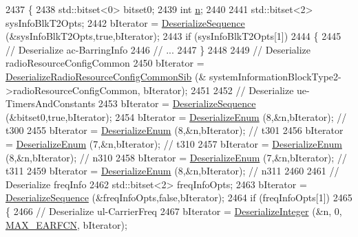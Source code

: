 \begin{DoxyCode}
2437 \{
2438   std::bitset<0> bitset0;
2439   \textcolor{keywordtype}{int} \hyperlink{namespacesample-rng-plot_aeb5ee5c431e338ef39b7ac5431242e1d}{n};
2440 
2441   std::bitset<2> sysInfoBlkT2Opts;
2442   bIterator = \hyperlink{classns3_1_1Asn1Header_a58c68bb97ba3fe2e8fcdd7c208d672b2}{DeserializeSequence} (&sysInfoBlkT2Opts,\textcolor{keyword}{true},bIterator);
2443   \textcolor{keywordflow}{if} (sysInfoBlkT2Opts[1])
2444     \{
2445       \textcolor{comment}{// Deserialize ac-BarringInfo}
2446       \textcolor{comment}{// ...}
2447     \}
2448 
2449   \textcolor{comment}{// Deserialize radioResourceConfigCommon}
2450   bIterator = \hyperlink{classns3_1_1RrcAsn1Header_af9c55f79d37667463fe12d6d1304b7e5}{DeserializeRadioResourceConfigCommonSib} (&
      systemInformationBlockType2->radioResourceConfigCommon, bIterator);
2451 
2452   \textcolor{comment}{// Deserialize ue-TimersAndConstants}
2453   bIterator = \hyperlink{classns3_1_1Asn1Header_a58c68bb97ba3fe2e8fcdd7c208d672b2}{DeserializeSequence} (&bitset0,\textcolor{keyword}{true},bIterator);
2454   bIterator = \hyperlink{classns3_1_1Asn1Header_a4fcc253e0eec3483c775b005c1875f2d}{DeserializeEnum} (8,&n,bIterator); \textcolor{comment}{// t300}
2455   bIterator = \hyperlink{classns3_1_1Asn1Header_a4fcc253e0eec3483c775b005c1875f2d}{DeserializeEnum} (8,&n,bIterator); \textcolor{comment}{// t301}
2456   bIterator = \hyperlink{classns3_1_1Asn1Header_a4fcc253e0eec3483c775b005c1875f2d}{DeserializeEnum} (7,&n,bIterator); \textcolor{comment}{// t310}
2457   bIterator = \hyperlink{classns3_1_1Asn1Header_a4fcc253e0eec3483c775b005c1875f2d}{DeserializeEnum} (8,&n,bIterator); \textcolor{comment}{// n310}
2458   bIterator = \hyperlink{classns3_1_1Asn1Header_a4fcc253e0eec3483c775b005c1875f2d}{DeserializeEnum} (7,&n,bIterator); \textcolor{comment}{// t311}
2459   bIterator = \hyperlink{classns3_1_1Asn1Header_a4fcc253e0eec3483c775b005c1875f2d}{DeserializeEnum} (8,&n,bIterator); \textcolor{comment}{// n311}
2460 
2461   \textcolor{comment}{// Deserialize freqInfo}
2462   std::bitset<2> freqInfoOpts;
2463   bIterator = \hyperlink{classns3_1_1Asn1Header_a58c68bb97ba3fe2e8fcdd7c208d672b2}{DeserializeSequence} (&freqInfoOpts,\textcolor{keyword}{false},bIterator);
2464   \textcolor{keywordflow}{if} (freqInfoOpts[1])
2465     \{
2466       \textcolor{comment}{// Deserialize ul-CarrierFreq}
2467       bIterator = \hyperlink{classns3_1_1Asn1Header_a49802c9af30018b078150e866b6ecae2}{DeserializeInteger} (&n, 0, \hyperlink{lte-rrc-header_8cc_a7851a91be0aab6446639f0ff8ee48b45}{MAX\_EARFCN}, bIterator);

\end{DoxyCode}
